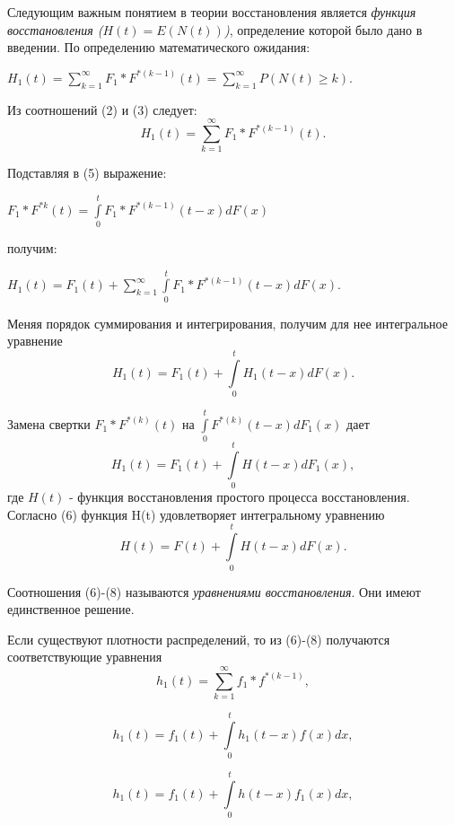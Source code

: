 Следующим важным понятием в теории восстановления является \textit{функция восстановления ($H(t) = E(N(t))$)}, определение которой было дано в введении. По определению математического ожидания:

$H_1(t) = \sum\limits_{k=1}^\infty F_1* F^{*(k-1)}(t) = \sum\limits_{k=1}^\infty P(N(t) \geqslant k).$

Из соотношений (2) и  (3) следует:
\begin{equation}
H_1(t) = \sum\limits_{k=1}^\infty F_1 * F^{*(k-1)}(t).
\end{equation}

Подставляя в  (5) выражение:

$F_1 * F^{*k}(t) = \int\limits_0^t F_1 * F^{*(k-1)}(t-x) dF(x)$

получим:

$H_1(t) = F_1(t) + \sum\limits_{k=1}^\infty \int\limits_0^t F_1 * F^{*(k-1)}(t-x) dF(x).$

Меняя порядок суммирования и интегрирования, получим для нее интегральное уравнение
\begin{equation}
H_1(t) = F_1(t) + \int\limits_0^t H_1(t-x) dF(x).
\end{equation}

Замена свертки $F_1 * F^{*(k)}(t)$ на $\int\limits_0^t F^{*(k)}(t-x) dF_1(x)$ дает
\begin{equation}
H_1(t) = F_1(t) + \int\limits_0^t H(t-x) dF_1(x),
\end{equation}
где $H(t)$ - функция восстановления простого процесса восстановления. Согласно (6) функция H(t) удовлетворяет интегральному уравнению
\begin{equation}
H(t) = F(t) + \int\limits_0^t H(t-x) dF(x).
\end{equation}

Соотношения (6)-(8) называются \textit{уравнениями восстановления}. Они имеют единственное решение.

Если существуют плотности распределений, то из (6)-(8) получаются соответствующие уравнения
\begin{equation}
h_1(t) = \sum\limits_{k=1}^\infty f_1 * f^{*(k-1)},
\end{equation}

\begin{equation}
h_1(t) = f_1(t) + \int\limits_0^t h_1(t-x) f(x) dx,
\end{equation}

\begin{equation}
h_1(t) = f_1(t) + \int\limits_0^t h(t-x) f_1(x) dx,
\end{equation}

